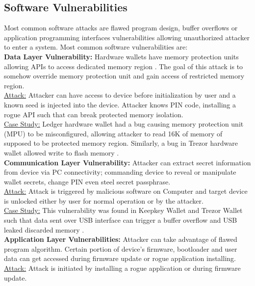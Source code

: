 \documentclass[conference]{IEEEtran}
\begin{document}
\subsection{Software Vulnerabilities}
Most common software attacks are flawed program design, buffer overflows or application programming interfaces vulnerabilities allowing unauthorized 
attacker to enter a system. Most common software vulnerabilities are:\\ 
\textbf{Data Layer Vulnerability:} Hardware wallets have memory protection units allowing APIs to access dedicated memory region 
\cite{suratkar2020cryptocurrency}. The goal of this attack is to somehow override memory protection unit and gain access of restricted 
memory region.\\
\underline{Attack:} Attacker can have access to device before initialization by user and a known seed is injected into the device. Attacker knows 
PIN code, installing a rogue API such that can break protected memory isolation.\\
\underline{Case Study:} Ledger hardware wallet had a bug causing memory protection unit (MPU) to be misconfigured, allowing attacker to read 16K 
of memory of supposed to be protected memory region\cite{ledgerdata1, ledgerdata2}. Similarly, a bug in Trezor hardware wallet allowed write to flash 
memory \cite{trezordata1}.\\
\textbf{Communication Layer Vulnerability:} Attacker can extract secret information from device via PC connectivity; commanding device to reveal 
or manipulate wallet secrets, change PIN even steel secret passphrase.\\
\underline{Attack:} Attack is triggered by malicious software on Computer and target device is unlocked either by user for normal operation or 
by the attacker. \\
\underline{Case Study:} This vulnerability was found in Keepkey Wallet\cite{keepkeystackoverflow} and Trezor Wallet such that data sent over USB 
interface can trigger a buffer overflow \cite{bufferoverflow} and USB leaked discarded memory \cite{usbleak}.\\
\textbf{Application Layer Vulnerabilities:} Attacker can take advantage of flawed program algorithm. Certain portion of device's firmware, bootloader 
and user data can get accessed during firmware update or rogue application installing.\\
\underline{Attack:} Attack is initiated by installing a rogue application or during firmware update.\\
\end{document}
